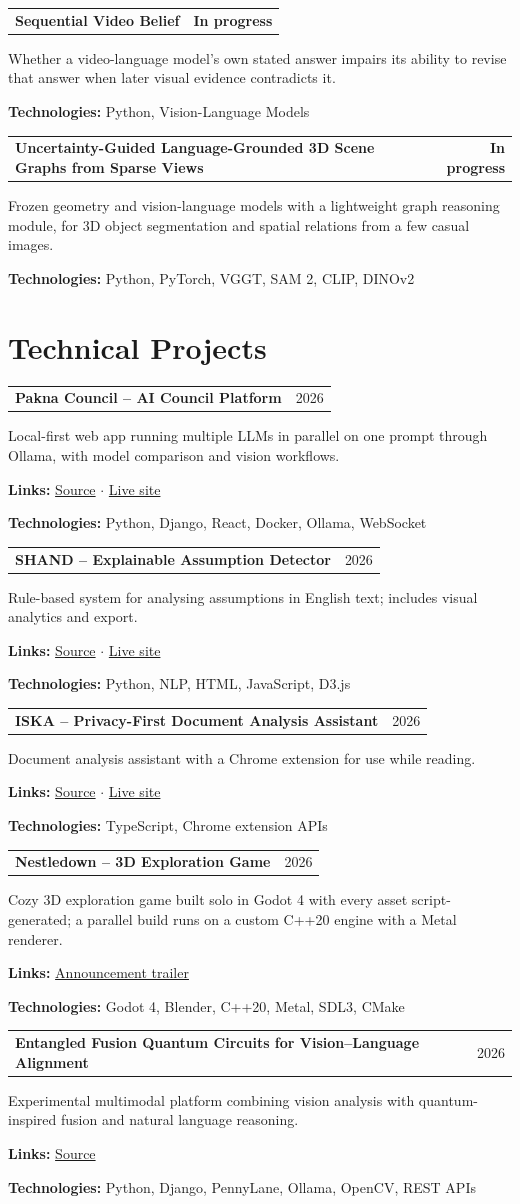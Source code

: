 \documentclass[11pt,letterpaper]{article}
\makeatletter
\newcommand{\entryhead}[2]{\par\vspace{3pt}\noindent%
  \begin{tabular*}{\textwidth}[t]{@{}>{\raggedright\arraybackslash}p{0.73\textwidth}@{\extracolsep{\fill}}r@{}}
    \textbf{#1} & #2
  \end{tabular*}\par\vspace{-1pt}}
\newcommand{\entry}[2]{\entryhead{#1}{\textbf{#2}}}
\newcommand{\entryplain}[2]{\entryhead{#1}{#2}}
\newcommand{\tech}[1]{\par\vspace{1pt}\noindent\textbf{Technologies:} #1\par}
\newcommand{\links}[1]{\par\vspace{1pt}\noindent\textbf{Links:} #1\par}
\newcommand{\gap}{\par\vspace{3pt}}
\makeatother
\begin{document}
\entry{Sequential Video Belief}{In progress}
Whether a video-language model's own stated answer impairs its ability to revise that answer when
later visual evidence contradicts it.
\tech{Python, Vision-Language Models}
\gap

\entry{Uncertainty-Guided Language-Grounded 3D Scene Graphs from Sparse Views}{In progress}
Frozen geometry and vision-language models with a lightweight graph reasoning module, for 3D
object segmentation and spatial relations from a few casual images.
\tech{Python, PyTorch, VGGT, SAM 2, CLIP, DINOv2}

\section{Technical Projects}

\entryplain{Pakna Council -- AI Council Platform}{2026}
Local-first web app running multiple LLMs in parallel on one prompt through Ollama, with model
comparison and vision workflows.
\links{\href{https://github.com/minhaz-42/Pakna_council}{Source} $\cdot$ \href{https://pakna-council.vercel.app/}{Live site}}
\tech{Python, Django, React, Docker, Ollama, WebSocket}
\gap

\entryplain{SHAND -- Explainable Assumption Detector}{2026}
Rule-based system for analysing assumptions in English text; includes visual analytics and export.
\links{\href{https://github.com/minhaz-42/SHAND}{Source} $\cdot$ \href{https://shand1.vercel.app/}{Live site}}
\tech{Python, NLP, HTML, JavaScript, D3.js}
\gap

\entryplain{ISKA -- Privacy-First Document Analysis Assistant}{2026}
Document analysis assistant with a Chrome extension for use while reading.
\links{\href{https://github.com/minhaz-42/ISKA}{Source} $\cdot$ \href{https://iska-hxrr.vercel.app/}{Live site}}
\tech{TypeScript, Chrome extension APIs}
\gap

\entryplain{Nestledown -- 3D Exploration Game}{2026}
Cozy 3D exploration game built solo in Godot 4 with every asset script-generated; a parallel build
runs on a custom C++20 engine with a Metal renderer.
\links{\href{https://youtu.be/MUN7_kuh00U}{Announcement trailer}}
\tech{Godot 4, Blender, C++20, Metal, SDL3, CMake}
\gap

\entryplain{Entangled Fusion Quantum Circuits for Vision--Language Alignment}{2026}
Experimental multimodal platform combining vision analysis with quantum-inspired fusion and
natural language reasoning.
\links{\href{https://github.com/minhaz-42/Entangled-Fusion-Quantum-Circuits-for-Vision-Language-Representation-Alignment}{Source}}
\tech{Python, Django, PennyLane, Ollama, OpenCV, REST APIs}
\gap
\end{document}
